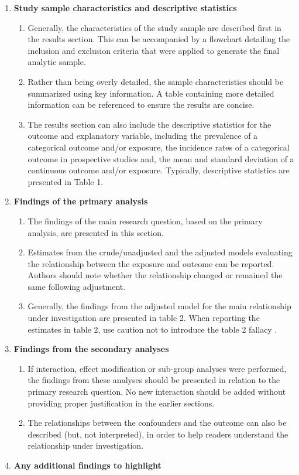 \documentclass[
]{book}
\begin{document}
\begin{enumerate}
\def\labelenumi{\arabic{enumi}.}
\item
  \textbf{Study sample characteristics and descriptive statistics}

  \begin{enumerate}
  \def\labelenumii{\alph{enumii}.}
  \item
    Generally, the characteristics of the study sample are described first in the results section. This can be accompanied by a flowchart detailing the inclusion and exclusion criteria that were applied to generate the final analytic sample.
  \item
    Rather than being overly detailed, the sample characteristics should be summarized using key information. A table containing more detailed information can be referenced to ensure the results are concise.
  \item
    The results section can also include the descriptive statistics for the outcome and explanatory variable, including the prevalence of a categorical outcome and/or exposure, the incidence rates of a categorical outcome in prospective studies and, the mean and standard deviation of a continuous outcome and/or exposure. Typically, descriptive statistics are presented in Table 1.
  \end{enumerate}
\item
  \textbf{Findings of the primary analysis}

  \begin{enumerate}
  \def\labelenumii{\alph{enumii}.}
  \item
    The findings of the main research question, based on the primary analysis, are presented in this section.
  \item
    Estimates from the crude/unadjusted and the adjusted models evaluating the relationship between the exposure and outcome can be reported. Authors should note whether the relationship changed or remained the same following adjustment.
  \item
    Generally, the findings from the adjusted model for the main relationship under investigation are presented in table 2. When reporting the estimates in table 2, use caution not to introduce the table 2 fallacy \citep{westreich2013table}.
  \end{enumerate}
\item
  \textbf{Findings from the secondary analyses}

  \begin{enumerate}
  \def\labelenumii{\alph{enumii}.}
  \item
    If interaction, effect modification or sub-group analyses were performed, the findings from these analyses should be presented in relation to the primary research question. No new interaction should be added without providing proper justification in the earlier sections.
  \item
    The relationships between the confounders and the outcome can also be described (but, not interpreted), in order to help readers understand the relationship under investigation.
  \end{enumerate}
\item
  \textbf{Any additional findings to highlight}


\end{enumerate}
\end{document}
